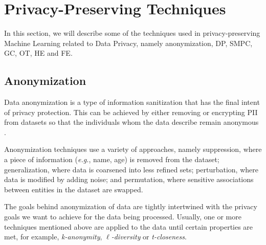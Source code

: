 \section{Privacy-Preserving Techniques}
\label{sec:PrivacyPreservingTechniques}


 In this section, we will describe some of the techniques used in privacy-preserving Machine Learning related to Data Privacy, namely anonymization, \ac{DP}, \ac{SMPC}, \ac{GC}, \ac{OT}, \ac{HE} and \ac{FE}.


\subsection{Anonymization}
\label{ssec:Anonymization}


Data anonymization is a type of information sanitization that has the final intent of privacy protection. This can be achieved by either removing or encrypting \ac{PII} from datasets so that the individuals whom the data describe remain anonymous \cite{raghunathan2013}.

Anonymization techniques use a variety of approaches, namely suppression, where a piece of information (\textit{e.g.}, name, age) is removed from the dataset; generalization, where data is coarsened into less refined sets; perturbation, where data is modified by adding noise; and permutation, where sensitive associations between entities in the dataset are swapped.

The goals behind anonymization of data are tightly intertwined with the privacy goals we want to achieve for the data being processed. Usually, one or more techniques mentioned above are applied to the data until certain properties are met, for example, \textit{k-anonymity}, $\ell$\textit{-diversity} or \textit{t-closeness}.

